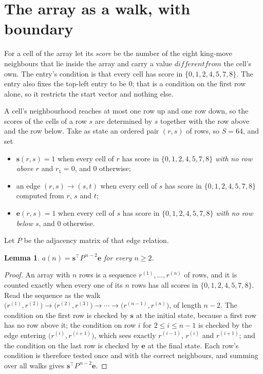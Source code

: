 \documentclass[11pt,a4paper]{article}
\theoremstyle{plain}
\newtheorem{lemma}[theorem]{Lemma}
\theoremstyle{definition}
\begin{document}
\section{The array as a walk, with boundary}

For a cell of the array let its \emph{score} be the number of the eight king-move neighbours that lie inside
the array and carry a value $different from$ the cell's own. The entry's condition is that every cell
has score in $\{0,1,2,4,5,7,8\}$. The entry also fixes the top-left entry to be $0$; that is a condition on the first row alone, so it restricts the start vector and nothing else.

A cell's neighbourhood reaches at most one row up and one row down, so the scores of the
cells of a row $s$ are determined by $s$ together with the row above and the row below.
Take as state an ordered pair $(r,s)$ of rows, so $S=64$, and set
\begin{itemize}
\item $\mathbf{s}(r,s)=1$ when every cell of $r$ has score in $\{0,1,2,4,5,7,8\}$ \emph{with no row
above $r$} and $r_1=0$, and $0$ otherwise;
\item an edge $(r,s)\to(s,t)$ when every cell of $s$ has score in $\{0,1,2,4,5,7,8\}$ computed from
$r$, $s$ and $t$;
\item $\mathbf{e}(r,s)=1$ when every cell of $s$ has score in $\{0,1,2,4,5,7,8\}$ \emph{with no row
below $s$}, and $0$ otherwise.
\end{itemize}
Let $P$ be the adjacency matrix of that edge relation.

\begin{lemma}\label{lem:walk}
$a(n)=\mathbf{s}^{\!\top}P^{\,n-2}\mathbf{e}$ for every $n\ge2$.
\end{lemma}

\begin{proof}
An array with $n$ rows is a sequence $r^{(1)},\dots,r^{(n)}$ of rows, and it is counted
exactly when every one of its $n$ rows has all scores in $\{0,1,2,4,5,7,8\}$. Read the sequence as the
walk $\bigl(r^{(1)},r^{(2)}\bigr)\to\bigl(r^{(2)},r^{(3)}\bigr)\to\cdots\to
\bigl(r^{(n-1)},r^{(n)}\bigr)$, of length $n-2$. The condition on the first row is
checked by $\mathbf{s}$ at the initial state, because a first row has no row above it; the
condition on row $i$ for $2\le i\le n-1$ is checked by the edge entering
$\bigl(r^{(i)},r^{(i+1)}\bigr)$, which sees exactly $r^{(i-1)}$, $r^{(i)}$ and
$r^{(i+1)}$; and the condition on the last row is checked by $\mathbf{e}$ at the final
state. Each row's condition is therefore tested once and with the correct neighbours, and
summing over all walks gives $\mathbf{s}^{\!\top}P^{\,n-2}\mathbf{e}$.
\end{proof}
\end{document}
